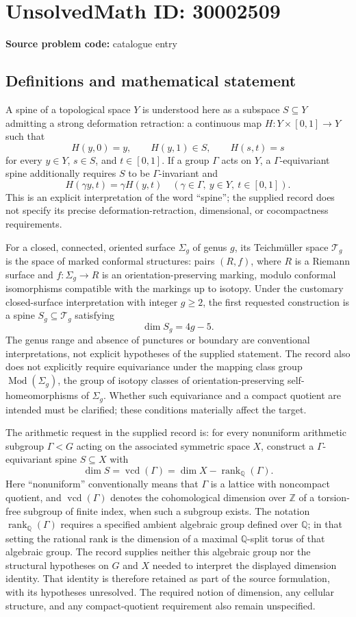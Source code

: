\documentclass[11pt]{article}
\newcommand{\Z}{\mathbb{Z}}
\newcommand{\Q}{\mathbb{Q}}
\begin{document}
\section*{UnsolvedMath ID: 30002509}
\textbf{Source problem code:} catalogue entry
\subsection{Definitions and mathematical statement}
A spine of a topological space \(Y\) is understood here as a subspace \(S\subseteq Y\) admitting a strong deformation retraction: a continuous map \(H:Y\times[0,1]\to Y\) such that
\[
H(y,0)=y,\qquad H(y,1)\in S,\qquad H(s,t)=s
\]
for every \(y\in Y\), \(s\in S\), and \(t\in[0,1]\). If a group \(\Gamma\) acts on \(Y\), a \(\Gamma\)-equivariant spine additionally requires \(S\) to be \(\Gamma\)-invariant and
\[
H(\gamma y,t)=\gamma H(y,t)
\quad(\gamma\in\Gamma,\ y\in Y,\ t\in[0,1]).
\]
This is an explicit interpretation of the word ``spine''; the supplied record does not specify its precise deformation-retraction, dimensional, or cocompactness requirements.

For a closed, connected, oriented surface \(\Sigma_g\) of genus \(g\), its Teichm\"uller space \(\mathcal T_g\) is the space of marked conformal structures: pairs \((R,f)\), where \(R\) is a Riemann surface and \(f:\Sigma_g\to R\) is an orientation-preserving marking, modulo conformal isomorphisms compatible with the markings up to isotopy. Under the customary closed-surface interpretation with integer \(g\geq2\), the first requested construction is a spine \(S_g\subseteq\mathcal T_g\) satisfying
\[
\dim S_g=4g-5.
\]
The genus range and absence of punctures or boundary are conventional interpretations, not explicit hypotheses of the supplied statement. The record also does not explicitly require equivariance under the mapping class group \(\operatorname{Mod}(\Sigma_g)\), the group of isotopy classes of orientation-preserving self-homeomorphisms of \(\Sigma_g\). Whether such equivariance and a compact quotient are intended must be clarified; these conditions materially affect the target.

The arithmetic request in the supplied record is: for every nonuniform arithmetic subgroup \(\Gamma<G\) acting on the associated symmetric space \(X\), construct a \(\Gamma\)-equivariant spine \(S\subseteq X\) with
\[
\dim S=\operatorname{vcd}(\Gamma)
       =\dim X-\operatorname{rank}_{\Q}(\Gamma).
\]
Here ``nonuniform'' conventionally means that \(\Gamma\) is a lattice with noncompact quotient, and \(\operatorname{vcd}(\Gamma)\) denotes the cohomological dimension over \(\Z\) of a torsion-free subgroup of finite index, when such a subgroup exists. The notation \(\operatorname{rank}_{\Q}(\Gamma)\) requires a specified ambient algebraic group defined over \(\Q\); in that setting the rational rank is the dimension of a maximal \(\Q\)-split torus of that algebraic group. The record supplies neither this algebraic group nor the structural hypotheses on \(G\) and \(X\) needed to interpret the displayed dimension identity. That identity is therefore retained as part of the source formulation, with its hypotheses unresolved. The required notion of dimension, any cellular structure, and any compact-quotient requirement also remain unspecified.
\end{document}
